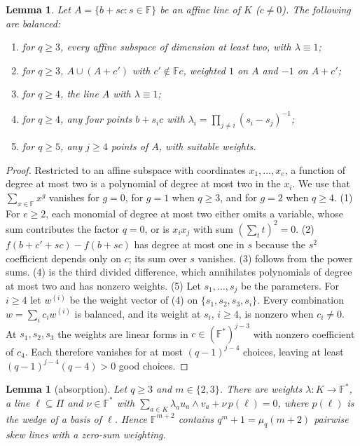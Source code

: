 \documentclass[11pt]{amsart}
\newtheorem{lemma}[theorem]{Lemma}
\theoremstyle{definition}
\theoremstyle{remark}
\newcommand{\F}{\mathbb F}
\begin{document}
\begin{lemma}\label{lem:blocks}
Let $A=\{b+sc:s\in\F\}$ be an affine line of $K$ ($c\ne0$). The following are balanced:
\begin{enumerate}
\item for $q\ge3$, every affine subspace of dimension at least two, with $\lambda\equiv1$;
\item for $q\ge3$, $A\cup(A+c')$ with $c'\notin\F c$, weighted $1$ on $A$ and $-1$ on $A+c'$;
\item for $q\ge4$, the line $A$ with $\lambda\equiv1$;
\item for $q\ge4$, any four points $b+s_ic$ with $\lambda_i=\prod_{j\ne i}(s_i-s_j)^{-1}$;
\item for $q\ge5$, any $j\ge4$ points of $A$, with suitable weights.
\end{enumerate}
\end{lemma}

\begin{proof}
Restricted to an affine subspace with coordinates $x_1,\dots,x_e$, a function of degree at most two is a polynomial of degree at most two in the $x_i$. We use that $\sum_{x\in\F}x^g$ vanishes for $g=0$, for $g=1$ when $q\ge3$, and for $g=2$ when $q\ge4$. (1) For $e\ge2$, each monomial of degree at most two either omits a variable, whose sum contributes the factor $q=0$, or is $x_ix_j$ with sum $(\sum_tt)^2=0$. (2) $f(b+c'+sc)-f(b+sc)$ has degree at most one in $s$ because the $s^2$ coefficient depends only on $c$; its sum over $s$ vanishes. (3) follows from the power sums. (4) is the third divided difference, which annihilates polynomials of degree at most two and has nonzero weights. (5) Let $s_1,\dots,s_j$ be the parameters. For $i\ge4$ let $w^{(i)}$ be the weight vector of (4) on $\{s_1,s_2,s_3,s_i\}$. Every combination $w=\sum_ic_iw^{(i)}$ is balanced, and its weight at $s_i$, $i\ge4$, is nonzero when $c_i\ne0$. At $s_1,s_2,s_3$ the weights are linear forms in $c\in(\F^\ast)^{j-3}$ with nonzero coefficient of $c_4$. Each therefore vanishes for at most $(q-1)^{j-4}$ choices, leaving at least $(q-1)^{j-4}(q-4)>0$ good choices.
\end{proof}

\begin{lemma}[absorption]\label{lem:absorb}
Let $q\ge3$ and $m\in\{2,3\}$. There are weights $\lambda:K\to\F^\ast$, a line $\ell\subseteq\Pi$ and $\nu\in\F^\ast$ with $\sum_{a\in K}\lambda_au_a\wedge v_a+\nu\,p(\ell)=0$, where $p(\ell)$ is the wedge of a basis of $\ell$. Hence $\F^{m+2}$ contains $q^m+1=\mu_q(m+2)$ pairwise skew lines with a zero-sum weighting.
\end{lemma}
\end{document}

